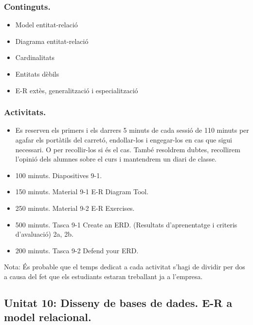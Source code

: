 \documentclass[catalan, a4paper, 12pt, titlepage]{article}
\begin{document}
  \subsubsection{Continguts.}
  \begin{itemize}
	  \item Model entitat-relació
	  \item Diagrama entitat-relació
	  \item Cardinalitats
	  \item Entitats dèbils
	  \item E-R extès, generalització i especialització
  \end{itemize}

  \subsubsection{Activitats.}
  \begin{itemize}
          \item Es reserven els primers i els darrers 5 minuts de cada sessió de 110 minuts per agafar els portàtils del carretó, endollar-los i engegar-los en cas que sigui necessari. O per recollir-los si és el cas. També resoldrem dubtes, recollirem l'opinió dels alumnes sobre el curs i mantendrem un diari de classe.
	  \item 100 minuts. Diapositives 9-1.
	  \item 150 minuts. Material 9-1 E-R Diagram Tool.
	  \item 250 minuts. Material 9-2 E-R Exercises.
	  \item 500 minuts. Tasca 9-1 Create an ERD. (\faGraduationCap Resultats d'aprenentatge i criteris d'avaluació) 2a, 2b.
	  \item 200 minuts. Tasca 9-2 Defend your ERD.
  \end{itemize}

  Nota: És probable que el temps dedicat a cada activitat s'hagi de dividir per dos a causa del fet que els estudiants estaran treballant ja a l'empresa.

  \subsection{Unitat 10: Disseny de bases de dades. E-R a model relacional.}
\end{document}
